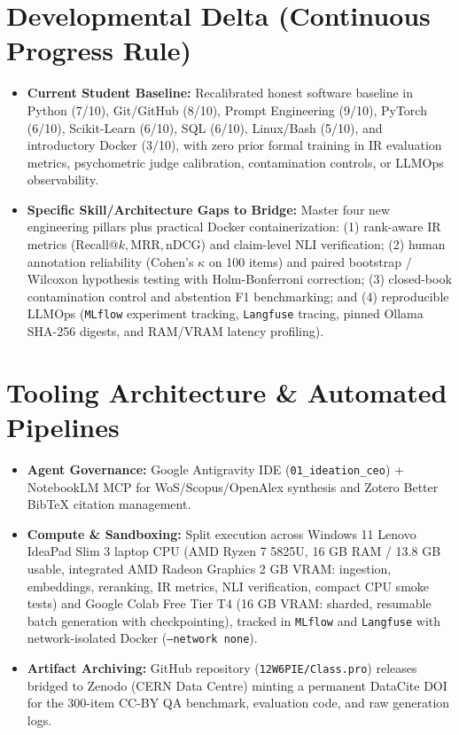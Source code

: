 \documentclass[10pt,a4paper]{article}
\begin{document}
\section{Developmental Delta (Continuous Progress Rule)}
\begin{itemize}
    \item \textbf{Current Student Baseline:} Recalibrated honest software baseline in Python (7/10), Git/GitHub (8/10), Prompt Engineering (9/10), PyTorch (6/10), Scikit-Learn (6/10), SQL (6/10), Linux/Bash (5/10), and introductory Docker (3/10), with zero prior formal training in IR evaluation metrics, psychometric judge calibration, contamination controls, or LLMOps observability.
    \item \textbf{Specific Skill/Architecture Gaps to Bridge:} Master four new engineering pillars plus practical Docker containerization: (1) rank-aware IR metrics ($\text{Recall@}k, \text{MRR}, \text{nDCG}$) and claim-level NLI verification; (2) human annotation reliability (Cohen's $\kappa$ on 100 items) and paired bootstrap / Wilcoxon hypothesis testing with Holm-Bonferroni correction; (3) closed-book contamination control and abstention F1 benchmarking; and (4) reproducible LLMOps (\texttt{MLflow} experiment tracking, \texttt{Langfuse} tracing, pinned Ollama SHA-256 digests, and RAM/VRAM latency profiling).
\end{itemize}

\section{Tooling Architecture \& Automated Pipelines}
\begin{itemize}
    \item \textbf{Agent Governance:} Google Antigravity IDE (\texttt{01\_ideation\_ceo}) + NotebookLM MCP for WoS/Scopus/OpenAlex synthesis and Zotero Better BibTeX citation management.
    \item \textbf{Compute \& Sandboxing:} Split execution across Windows 11 Lenovo IdeaPad Slim 3 laptop CPU (AMD Ryzen 7 5825U, 16 GB RAM / 13.8 GB usable, integrated AMD Radeon Graphics 2 GB VRAM: ingestion, embeddings, reranking, IR metrics, NLI verification, compact CPU smoke tests) and Google Colab Free Tier T4 (16 GB VRAM: sharded, resumable batch generation with checkpointing), tracked in \texttt{MLflow} and \texttt{Langfuse} with network-isolated Docker (\texttt{--network none}).
    \item \textbf{Artifact Archiving:} GitHub repository (\texttt{12W6PIE/Class.pro}) releases bridged to Zenodo (CERN Data Centre) minting a permanent DataCite DOI for the 300-item CC-BY QA benchmark, evaluation code, and raw generation logs.
\end{itemize}
\end{document}
